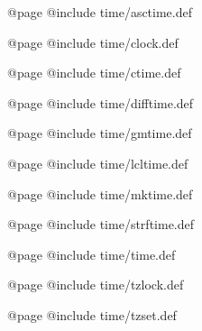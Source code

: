 @page
@include time/asctime.def

@page
@include time/clock.def

@page
@include time/ctime.def

@page
@include time/difftime.def

@page
@include time/gmtime.def

@page
@include time/lcltime.def

@page
@include time/mktime.def

@page
@include time/strftime.def

@page
@include time/time.def

@page
@include time/tzlock.def

@page
@include time/tzset.def

